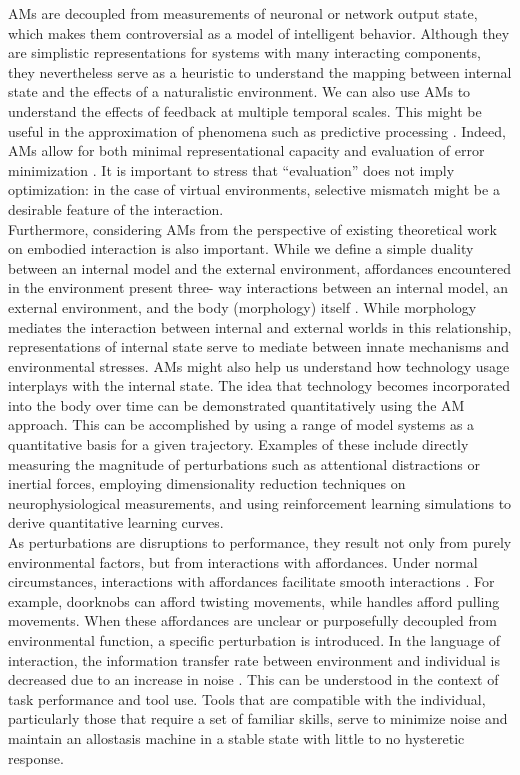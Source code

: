 \documentclass{sigchi}
\begin{document}
AMs are decoupled from measurements of neuronal or network output state, which makes them controversial as a model of intelligent behavior. Although they are simplistic representations for systems with many interacting components, they nevertheless serve as a heuristic to understand the mapping between internal state and the effects of a naturalistic environment. We can also use AMs to understand the effects of feedback at multiple temporal scales. This might be useful in the approximation of phenomena such as predictive processing \cite{nave}. Indeed, AMs allow for both minimal representational capacity and evaluation of error minimization \cite{williams}. It is important to stress that “evaluation” does not imply optimization: in the case of virtual environments, selective mismatch might be a desirable feature of the interaction. 
\\
Furthermore, considering AMs from the perspective of existing theoretical work on embodied interaction is also important. While we define a simple duality between an internal model and the external environment, affordances encountered in the environment present three- way interactions between an internal model, an external environment, and the body (morphology) itself \cite{Dourish:2001:WAI}. While morphology mediates the interaction between internal and external worlds in this relationship, representations of internal state serve to mediate between innate mechanisms and environmental stresses. AMs might also help us understand how technology usage interplays with the internal state. The idea that technology becomes incorporated into the body over time \cite{clark} can be demonstrated quantitatively using the AM approach. This can be accomplished by using a range of model systems as a quantitative basis for a given trajectory. Examples of these include directly measuring the magnitude of perturbations such as attentional distractions or inertial forces, employing dimensionality reduction techniques on neurophysiological measurements, and using reinforcement learning simulations to derive quantitative learning curves.\\
As perturbations are disruptions to performance, they result not only from purely environmental factors, but from interactions with affordances. Under normal circumstances, interactions with affordances facilitate smooth interactions \cite{chemero}. For example, doorknobs can afford twisting movements, while handles afford pulling movements. When these affordances are unclear or purposefully decoupled from environmental function, a specific perturbation is introduced. In the language of interaction, the information transfer rate between environment and individual is decreased due to an increase in noise \cite{hornback-oulasvirta}. This can be understood in the context of task performance and tool use. Tools that are compatible with the individual, particularly those that require a set of familiar skills, serve to minimize noise and maintain an allostasis machine in a stable state with little to no hysteretic response.\\ 
\end{document}
